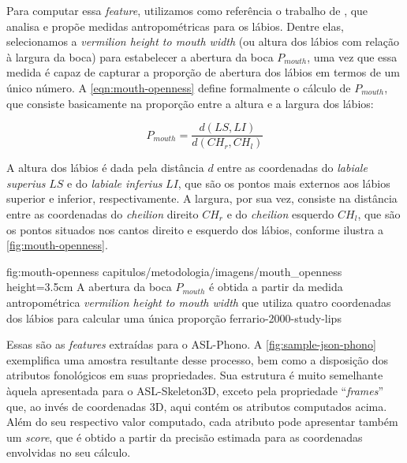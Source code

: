\begin{enumerate}
          Para computar essa \textit{feature}, utilizamos como referência o trabalho de , que analisa e propõe medidas antropométricas para os lábios.
          Dentre elas, selecionamos a \textit{vermilion height to mouth width} (ou altura dos lábios com relação à largura da boca) para estabelecer a abertura da boca \(P_{mouth}\), uma vez que essa medida é capaz de capturar a proporção de abertura dos lábios em termos de um único número.
          A \autoref{eqn:mouth-openness} define formalmente o cálculo de \(P_{mouth}\), que consiste basicamente na proporção entre a altura e a largura dos lábios:

          \begin{equation}
              \label{eqn:mouth-openness}
              P_{mouth} = \frac{d(LS, LI)}{d(CH_r, CH_l)}
          \end{equation}

          A altura dos lábios é dada pela distância \(d\) entre as coordenadas do \textit{labiale superius} \(LS\) e do \textit{labiale inferius} \(LI\), que são os pontos mais externos aos lábios superior e inferior, respectivamente. A largura, por sua vez, consiste na distância entre as coordenadas do \textit{cheilion} direito \(CH_r\) e do \textit{cheilion} esquerdo \(CH_l\), que são os pontos situados nos cantos direito e esquerdo dos lábios, conforme ilustra a \autoref{fig:mouth-openness}.

          \figura
          {fig:mouth-openness} %
          {capitulos/metodologia/imagens/mouth_openness} %
          {height=3.5cm} %
          {A abertura da boca \(P_{mouth}\) é obtida a partir da medida antropométrica \textit{vermilion height to mouth width} que utiliza quatro coordenadas dos lábios para calcular uma única proporção} %
          {ferrario-2000-study-lips} %

\end{enumerate}


Essas são as \textit{features} extraídas para o ASL-Phono.
A \autoref{fig:sample-json-phono} exemplifica uma amostra resultante desse processo, bem como a disposição dos atributos fonológicos em suas propriedades.
Sua estrutura é muito semelhante àquela apresentada para o ASL-Skeleton3D, exceto pela propriedade ``\textit{frames}'' que, ao invés de coordenadas 3D, aqui contém os atributos computados acima. Além do seu respectivo valor computado, cada atributo pode apresentar também um \textit{score}, que é obtido a partir da precisão estimada para as coordenadas envolvidas no seu cálculo.

